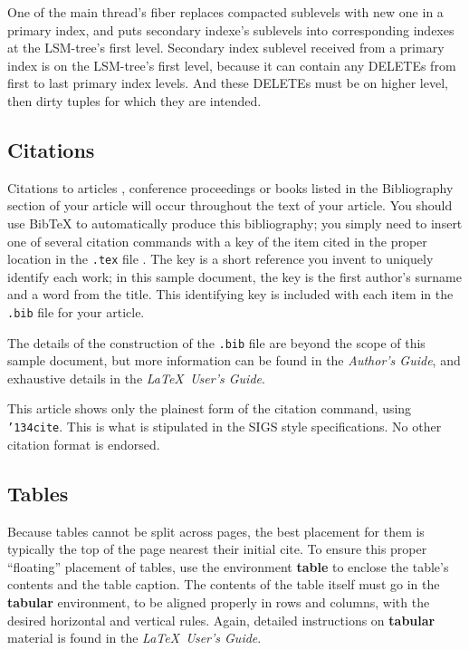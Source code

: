 \documentclass{vldb}
\begin{document}
One of the main thread's fiber replaces compacted sublevels with new one in a
primary index, and puts secondary indexe's sublevels into corresponding indexes
at the LSM-tree's first level. Secondary index sublevel received from a primary
index is on the LSM-tree's first level, because it can contain any DELETEs from
first to last primary index levels. And these DELETEs must be on higher level,
then dirty tuples for which they are intended.

\subsection{Citations}
Citations to articles \cite{bowman:reasoning, clark:pct, braams:babel, herlihy:methodology},
conference
proceedings \cite{clark:pct} or books \cite{salas:calculus, Lamport:LaTeX} listed
in the Bibliography section of your
article will occur throughout the text of your article.
You should use BibTeX to automatically produce this bibliography;
you simply need to insert one of several citation commands with
a key of the item cited in the proper location in
the \texttt{.tex} file \cite{Lamport:LaTeX}.
The key is a short reference you invent to uniquely
identify each work; in this sample document, the key is
the first author's surname and a
word from the title.  This identifying key is included
with each item in the \texttt{.bib} file for your article.

The details of the construction of the \texttt{.bib} file
are beyond the scope of this sample document, but more
information can be found in the \textit{Author's Guide},
and exhaustive details in the \textit{\LaTeX\ User's
Guide}\cite{Lamport:LaTeX}.

This article shows only the plainest form
of the citation command, using \texttt{{\char'134}cite}.
This is what is stipulated in the SIGS style specifications.
No other citation format is endorsed.

\subsection{Tables}
Because tables cannot be split across pages, the best
placement for them is typically the top of the page
nearest their initial cite.  To
ensure this proper ``floating'' placement of tables, use the
environment \textbf{table} to enclose the table's contents and
the table caption.  The contents of the table itself must go
in the \textbf{tabular} environment, to
be aligned properly in rows and columns, with the desired
horizontal and vertical rules.  Again, detailed instructions
on \textbf{tabular} material
is found in the \textit{\LaTeX\ User's Guide}.
\end{document}
